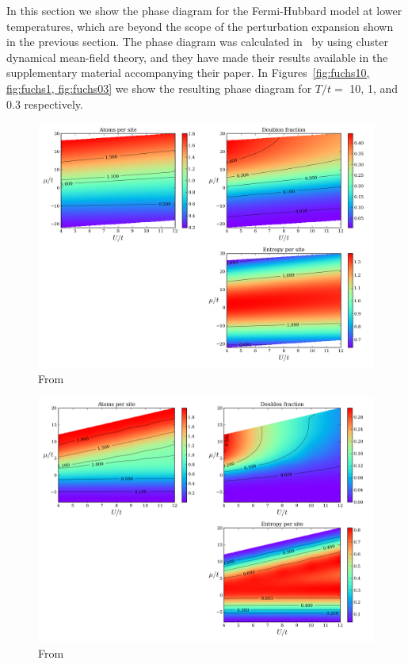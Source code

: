 \documentclass[oneside,11pt]{memoir}
\begin{document}
In this section we show the phase diagram for the Fermi-Hubbard model at lower
temperatures, which are beyond the scope of the perturbation expansion shown in
the previous section.   The phase diagram was calculated in~\cite{Fuchs2011} by
using cluster dynamical mean-field theory, and they have made their results
available in the supplementary material accompanying their paper.  In
Figures~\ref{fig:fuchs10, fig:fuchs1, fig:fuchs03} we show the resulting phase
diagram for $T/t=$ 10, 1, and 0.3 respectively.

\begin{figure}
\centering \includegraphics[width=\textwidth]{../figures/HubbardPhaseDiagram_figures/FUCHS_phasesT=100.png}
\caption[Low temperature phase diagram of the Fermi-Hubbard model]{\small
From~\cite{Fuchs2011}} \label{fig:fuchs10}
\end{figure}

\begin{figure}
\centering \includegraphics[width=\textwidth]{../figures/HubbardPhaseDiagram_figures/FUCHS_phasesT=10.png}
\caption[Low temperature phase diagram of the Fermi-Hubbard model]{\small
From~\cite{Fuchs2011}} \label{fig:fuchs10}
\end{figure}
   
\end{document}
